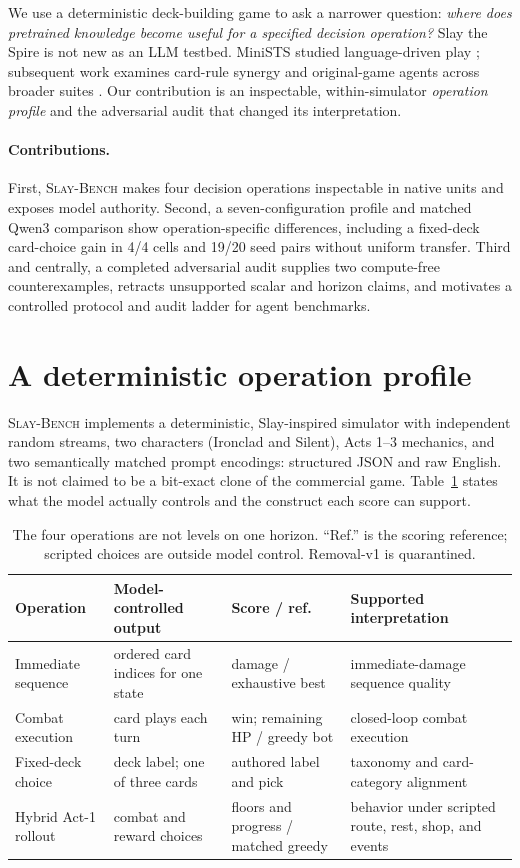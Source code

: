 \documentclass{article}
\newcommand{\bench}{\textsc{Slay-Bench}}
\begin{document}
We use a deterministic deck-building game to ask a narrower question: \emph{where does
pretrained knowledge become useful for a specified decision operation?} Slay the Spire
is not new as an LLM testbed. MiniSTS studied language-driven play
\citep{bateni2024language}; subsequent work examines card-rule synergy
\citep{kim2025synergy} and original-game agents across broader suites
\citep{park2025orak}. Our contribution is an inspectable, within-simulator
\emph{operation profile} and the adversarial audit that changed its interpretation.

\paragraph{Contributions.}
First, \bench{} makes four decision operations inspectable in native units and exposes
model authority. Second, a seven-configuration profile and matched Qwen3 comparison
show operation-specific differences, including a fixed-deck card-choice gain in 4/4
cells and 19/20 seed pairs without uniform transfer. Third and centrally, a completed
adversarial audit supplies two compute-free counterexamples, retracts unsupported
scalar and horizon claims, and motivates a controlled protocol and audit ladder for
agent benchmarks.

\section{A deterministic operation profile}

\bench{} implements a deterministic, Slay-inspired simulator with independent random
streams, two characters (Ironclad and Silent), Acts 1--3 mechanics, and two semantically
matched prompt encodings: structured JSON and raw English. It is not claimed to be a
bit-exact clone of the commercial game. Table~\ref{tab:tasks} states what the model
actually controls and the construct each score can support.

\begin{table}[t]
\caption{The four operations are not levels on one horizon. ``Ref.'' is the scoring
reference; scripted choices are outside model control. Removal-v1 is quarantined.}
\label{tab:tasks}
\centering
\scriptsize
\setlength{\tabcolsep}{3.2pt}
\begin{tabular}{@{}p{1.02in}p{1.38in}p{1.08in}p{1.48in}@{}}
\toprule
Operation & Model-controlled output & Score / ref. & Supported interpretation \\
\midrule
Immediate sequence & ordered card indices for one state & damage / exhaustive best & immediate-damage sequence quality \\
Combat execution & card plays each turn & win; remaining HP / greedy bot & closed-loop combat execution \\
Fixed-deck choice & deck label; one of three cards & authored label and pick & taxonomy and card-category alignment \\
Hybrid Act-1 rollout & combat and reward choices & floors and progress / matched greedy & behavior under scripted route, rest, shop, and events \\
\bottomrule
\end{tabular}
\end{table}
\end{document}
